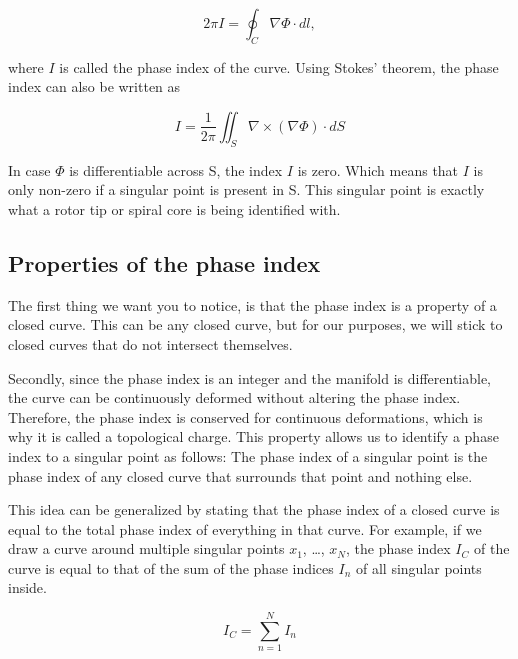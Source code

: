 \documentclass[twocolumn]{article}
\begin{document}
\begin{equation}
  2\pi I = \oint_C \nabla \Phi \cdot dl ,
  \label{eq:phase-index}
\end{equation}

\noindent where \(I\) is called the phase index of the curve. Using Stokes'
theorem, the phase index can also be written as

\begin{equation}
  I = \frac{1}{2\pi} \iint_S \nabla \times (\nabla \Phi) \cdot dS
  \label{eq:phase-index-stokes}
\end{equation}

\noindent In case \(\Phi\) is differentiable across S, the index \(I\) is zero.
Which means that \(I\) is only non-zero if a singular point is present
in S. \autocite{herlin2012reconstruction} This singular point is exactly
what a rotor tip or spiral core is being identified with.

\subsection{Properties of the phase
index}\label{properties-of-the-phase-index}

The first thing we want you to notice, is that the phase index is a
property of a closed curve. This can be any closed curve, but for our
purposes, we will stick to closed curves that do not intersect
themselves.

Secondly, since the phase index is an integer and the manifold is
differentiable, the curve can be continuously deformed without altering
the phase index. Therefore, the phase index is conserved for continuous
deformations, which is why it is called a topological charge. This
property allows us to identify a phase index to a singular point as
follows: The phase index of a singular point is the phase index of any
closed curve that surrounds that point and nothing else.

This idea can be generalized by stating that the phase index of a closed
curve is equal to the total phase index of everything in that curve. For
example, if we draw a curve around multiple singular points \(x_1\),
\ldots, \(x_N\), the phase index \(I_C\) of the curve is equal to that
of the sum of the phase indices \(I_n\) of all singular points inside.

\begin{equation}
  I_C = \sum^N_{n=1} I_n
  \label{eq:index-curve}
\end{equation}
\end{document}
